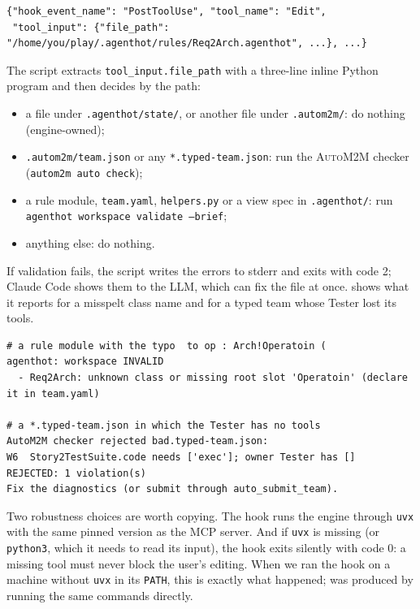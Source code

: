 \documentclass[10pt,a4paper]{article}
\newcommand{\auto}{\textsc{AutoM2M}}
\newcommand{\cc}{Claude Code}
\newcommand{\code}[1]{\texttt{#1}}
\newcommand{\file}[1]{\texttt{#1}}
\begin{document}
\begin{lstlisting}[style=wire, caption={Illustrative: the input of a \code{PostToolUse} hook (abridged; the fields used here are real).}, label={lst:hookin}]
{"hook_event_name": "PostToolUse", "tool_name": "Edit",
 "tool_input": {"file_path": "/home/you/play/.agenthot/rules/Req2Arch.agenthot", ...}, ...}
\end{lstlisting}

The script extracts \code{tool\_input.file\_path} with a three-line inline
Python program and then decides by the path:

\begin{itemize}[itemsep=1pt]
\item a file under \file{.agenthot/state/}, or another file under
\file{.autom2m/}: do nothing (engine-owned);
\item \file{.autom2m/team.json} or any \file{*.typed-team.json}: run
the \auto{} checker (\code{autom2m auto check});
\item a rule module, \file{team.yaml}, \file{helpers.py} or a view spec in
\file{.agenthot/}: run \code{agenthot workspace validate --brief};
\item anything else: do nothing.
\end{itemize}

If validation fails, the script writes the errors to stderr and exits with
code 2; \cc{} shows them to the LLM, which can fix the file at once.
 shows what it reports for a misspelt class name and for a
typed team whose Tester lost its tools.

\begin{lstlisting}[style=engine, caption={Observed: what the validation hook reports (we ran the commands the hook runs; file path shortened).}, label={lst:hookerr}]
# a rule module with the typo  to op : Arch!Operatoin (
agenthot: workspace INVALID
  - Req2Arch: unknown class or missing root slot 'Operatoin' (declare it in team.yaml)

# a *.typed-team.json in which the Tester has no tools
AutoM2M checker rejected bad.typed-team.json:
W6  Story2TestSuite.code needs ['exec']; owner Tester has []
REJECTED: 1 violation(s)
Fix the diagnostics (or submit through auto_submit_team).
\end{lstlisting}

Two robustness choices are worth copying. The hook runs the engine through
\code{uvx} with the same pinned version as the MCP server. And if \code{uvx}
is missing (or \code{python3}, which it needs to read its input), the hook
exits silently with code 0: a missing tool must never block the user's
editing. When we ran the hook on a machine without \code{uvx} in its
\code{PATH}, this is exactly what happened;  was produced
by running the same commands directly.
\end{document}
